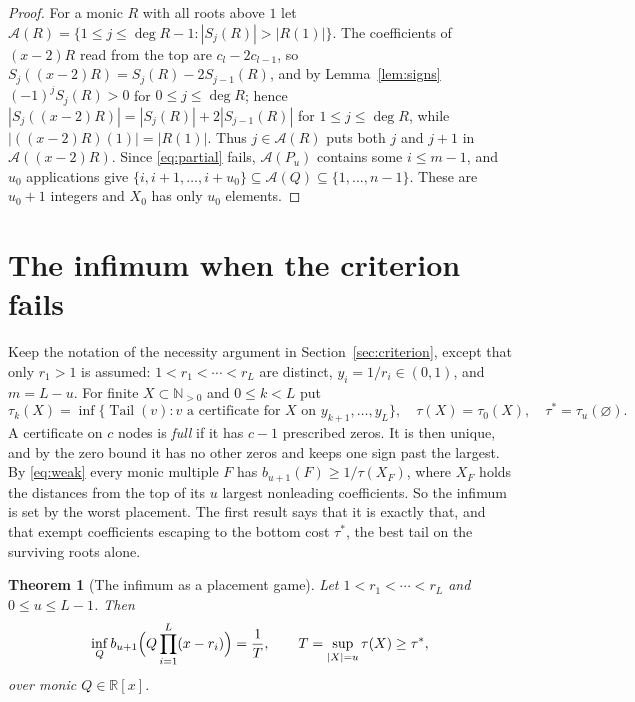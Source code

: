 \documentclass[11pt]{article}
\newtheorem{theorem}{Theorem}[section]
\theoremstyle{definition}
\theoremstyle{plain}
\newcommand{\R}{\mathbb R}
\newcommand{\N}{\mathbb N}
\DeclareMathOperator{\Tail}{Tail}
\begin{document}
\begin{proof}
For a monic $R$ with all roots above $1$ let
$\mathcal A(R)=\{1\le j\le\deg R-1:|S_j(R)|>|R(1)|\}$.  The coefficients of
$(x-2)R$ read from the top are $c_l-2c_{l-1}$, so
$S_j((x-2)R)=S_j(R)-2S_{j-1}(R)$, and by Lemma~\ref{lem:signs}
$(-1)^jS_j(R)>0$ for $0\le j\le\deg R$; hence
$|S_j((x-2)R)|=|S_j(R)|+2|S_{j-1}(R)|$ for $1\le j\le\deg R$, while
$|((x-2)R)(1)|=|R(1)|$.  Thus $j\in\mathcal A(R)$ puts both $j$ and $j+1$ in
$\mathcal A((x-2)R)$.  Since \eqref{eq:partial} fails, $\mathcal A(P_u)$
contains some $i\le m-1$, and $u_0$ applications give
$\{i,i+1,\ldots,i+u_0\}\subseteq\mathcal A(Q)\subseteq\{1,\ldots,n-1\}$.
These are $u_0+1$ integers and $X_0$ has only $u_0$ elements.
\end{proof}

\section{The infimum when the criterion fails}\label{sec:value}

Keep the notation of the necessity argument in
Section~\ref{sec:criterion}, except that only $r_1>1$ is assumed: $1<r_1<\cdots<r_L$
are distinct, $y_i=1/r_i\in(0,1)$, and $m=L-u$.  For finite $X\subset\N_{>0}$ and
$0\le k<L$ put
\[
  \tau_k(X)=\inf\bigl\{\Tail(v):v\text{ a certificate for }X\text{ on }
  y_{k+1},\ldots,y_L\bigr\},
  \quad \tau(X)=\tau_0(X),\quad \tau^*=\tau_u(\varnothing).
\]
A certificate on $c$ nodes is \emph{full} if it has $c-1$ prescribed zeros.
It is then unique, and by the zero bound it has no other zeros and keeps one
sign past the largest.  By \eqref{eq:weak} every monic multiple $F$ has
$b_{u+1}(F)\ge1/\tau(X_F)$, where $X_F$ holds the distances from the top of
its $u$ largest nonleading coefficients.  So the infimum is set by the worst
placement.  The first result says that it is exactly that, and that exempt
coefficients escaping to the bottom cost $\tau^*$, the best tail on the
surviving roots alone.

\begin{theorem}[The infimum as a placement game]\label{thm:value}
Let $1<r_1<\cdots<r_L$ and $0\le u\le L-1$.  Then
\[
  \inf_Qb_{u+1}\Bigl(Q\prod_{i=1}^L(x-r_i)\Bigr)=\frac1T,
  \qquad T=\sup_{|X|=u}\tau(X)\ge\tau^*,
\]
over monic $Q\in\R[x]$.
\end{theorem}
\end{document}

